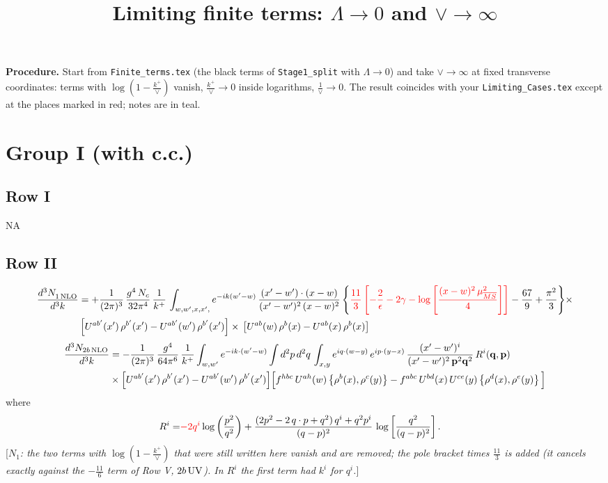 \documentclass[9pt]{article}
\title{Limiting finite terms: $\Lambda\to0$ and $\vee\to\infty$}
\author{}
\date{}
\numberwithin{equation}{section}
\newcommand{\chg}[1]{{\color{red}#1}}
\newcommand{\rnote}[1]{{\color{teal}[\textit{#1}]}}
\begin{document}
\maketitle
\noindent\textbf{Procedure.} Start from \texttt{Finite\_terms.tex} (the black terms of \texttt{Stage1\_split} with $\Lambda\to0$) and take $\vee\to\infty$ at fixed transverse coordinates: terms with $\log(1-\frac{k^{+}}{\vee})$ vanish, $\frac{k^{+}}{\vee}\to0$ inside logarithms, $\frac{1}{\vee}\to0$. The result coincides with your \texttt{Limiting\_Cases.tex} except at the places marked in {\color{red}red}; notes are in {\color{teal}teal}.

\section{Group I (with c.c.)}
\subsection{Row I}
\textsc{NA}
\subsection{Row II}
\begin{align}
     \frac{d^{3}N_{1\,\rm NLO}^{\rm}}{d^{3}k} &  =  +\frac{1}{(2\pi)^{3}}\, \frac{g^{4}\,N_{c}}{32\pi^{4}}\,\frac{1}{k^{+}}\, \int_{w, w',x,x',} e^{-ik(w^\prime-w)}\, \frac{(x'-w')\cdot (x-w)}{(x'-w')^{2}\, (x-w)^{2}}\, \Bigg\{ \chg{\frac{11}{3}\left[-\frac{2}{\epsilon}-2\gamma-\log{\left[\frac{(x-w)^{2}\,\mu^{2}_{\overline{MS}}}{4}\right]}\right]}-\frac{67}{9}+\frac{\pi^{2}}{3}\Bigg\}\times\notag \\ & \left[U^{ab'}(x')\,\rho^{b'}(x') - U^{ab'}(w')\,\rho^{b'}(x')\right]\times\,\left[U^{ab}(w)\,\rho^{b}(x) - U^{ab}(x)\,\rho^{b}(x)\right]
\end{align}  
\begin{align}
\frac{d^{3}N_{2b\,\rm NLO}}{d^{3}k} & = -\frac{1}{(2\pi)^{3}}\,\frac{g^{4}}{64\pi^{6}}\,\frac{1}{k^{+}}\int_{w,w'} e^{-ik\cdot(w'-w)}
\int d^{2}p\,d^{2}q\,\int_{x,y} e^{iq\cdot(w-y)}\,e^{ip\cdot(y-x)}\,\frac{(x'-w')^{i}}{(x'-w')^{2}\,\mathbf{p}^{2}\mathbf{q}^{2}}\,R^{i}(\mathbf{q},\mathbf{p})\notag\\ &\times\Big[U^{ab'}(x')\,\rho^{b'}(x')-U^{ab'}(w')\,\rho^{b'}(x')\Big]
\Big[f^{hbc}\,U^{ah}(w)\left\{\rho^{b}(x),\rho^{c}(y)\right\}-f^{abc}\,U^{bd}(x)\,U^{ce}(y)\left\{\rho^{d}(x),\rho^{e}(y)\right\}\Big]
\end{align}
where
\begin{align}
R^{i} =& \chg{-2q^{i}}\log\left(\frac{p^{2}}{q^{2}}\right)
+\frac{(2p^{2}-2\,q\cdot p+q^{2})\,q^{i}+q^{2}p^{i}}{(q-p)^{2}}\,
\log\left[\frac{q^{2}}{(q-p)^{2}}\right].
\end{align}
\rnote{$N_{1}$: the two terms with $\log(1-\frac{k^{+}}{\vee})$ that were still written here vanish and are removed; the pole bracket times $\frac{11}{3}$ is added (it cancels exactly against the $-\frac{11}{6}$ term of Row V, $2b\,{\rm UV}$). In $R^{i}$ the first term had $k^{i}$ for $q^{i}$.}
\end{document}
